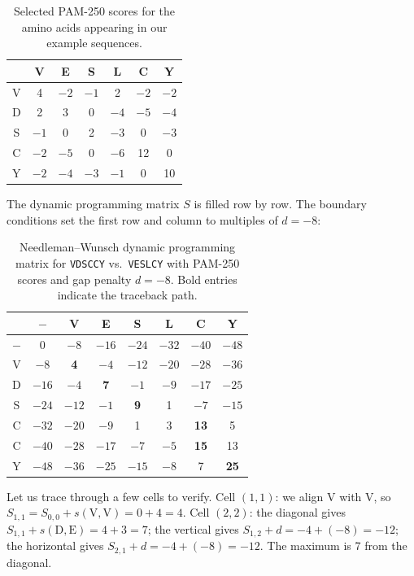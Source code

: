 \begin{table}[h]
  \centering
  \begin{tabular}{c|cccccc}
      & V & E & S & L & C & Y \\ \hline
    V & 4 & $-2$ & $-1$ & 2 & $-2$ & $-2$ \\
    D & 2 & 3 & 0 & $-4$ & $-5$ & $-4$ \\
    S & $-1$ & 0 & 2 & $-3$ & 0 & $-3$ \\
    C & $-2$ & $-5$ & 0 & $-6$ & 12 & 0 \\
    Y & $-2$ & $-4$ & $-3$ & $-1$ & 0 & 10 \\
  \end{tabular}
  \caption{Selected PAM-250 scores for the amino acids appearing in our example sequences.}
  \label{tab:pam250-example}
\end{table}

The dynamic programming matrix $S$ is filled row by row. The boundary conditions set the first row and column to multiples of $d = -8$:

\begin{table}[h]
  \centering
  \begin{tabular}{c|ccccccc}
      & $-$ & V & E & S & L & C & Y \\ \hline
    $-$ & 0 & $-8$ & $-16$ & $-24$ & $-32$ & $-40$ & $-48$ \\
    V & $-8$ & \textbf{4} & $-4$ & $-12$ & $-20$ & $-28$ & $-36$ \\
    D & $-16$ & $-4$ & \textbf{7} & $-1$ & $-9$ & $-17$ & $-25$ \\
    S & $-24$ & $-12$ & $-1$ & \textbf{9} & 1 & $-7$ & $-15$ \\
    C & $-32$ & $-20$ & $-9$ & 1 & 3 & \textbf{13} & 5 \\
    C & $-40$ & $-28$ & $-17$ & $-7$ & $-5$ & \textbf{15} & 13 \\
    Y & $-48$ & $-36$ & $-25$ & $-15$ & $-8$ & 7 & \textbf{25} \\
  \end{tabular}
  \caption{Needleman--Wunsch dynamic programming matrix for \texttt{VDSCCY} vs.\ \texttt{VESLCY} with PAM-250 scores and gap penalty $d = -8$. Bold entries indicate the traceback path.}
  \label{tab:nw-matrix}
\end{table}

Let us trace through a few cells to verify. Cell $(1,1)$: we align V with V, so $S_{1,1} = S_{0,0} + s(\text{V},\text{V}) = 0 + 4 = 4$. Cell $(2,2)$: the diagonal gives $S_{1,1} + s(\text{D},\text{E}) = 4 + 3 = 7$; the vertical gives $S_{1,2} + d = -4 + (-8) = -12$; the horizontal gives $S_{2,1} + d = -4 + (-8) = -12$. The maximum is 7 from the diagonal.

